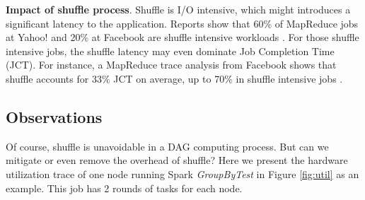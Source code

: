 \textbf{Impact of shuffle process}. Shuffle is I/O intensive, which might introduces a significant latency to the application. 
Reports show that 60\% of MapReduce jobs at Yahoo! and 20\% at Facebook are shuffle intensive workloads \cite{shufflewatcher}. 
For those shuffle intensive jobs, the shuffle latency may even dominate Job Completion Time (JCT).
For instance, a MapReduce trace analysis from Facebook shows that shuffle accounts for 33\% JCT on average, up to 70\% in shuffle intensive jobs \cite{managing}.


\subsection{Observations} \label{observation}
Of course, shuffle is unavoidable in a DAG computing process. 
But can we mitigate or even remove the overhead of shuffle? 
Here we present the hardware utilization trace of one node running Spark \textit{GroupByTest} in Figure \ref{fig:util} as an example. 
This job has 2 rounds of tasks for each node.



